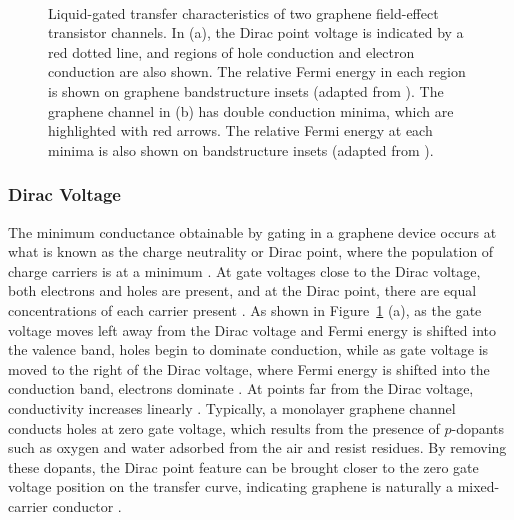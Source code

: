 \documentclass[
  a4paper,
]{scrbook}
\begin{document}
\begin{figure}
\begin{minipage}[t]{0.45\linewidth}
\end{minipage}%
%
\begin{minipage}[t]{0.01\linewidth}

{\centering 

~

}

\end{minipage}%

\caption{\label{fig-graphene-characteristics}Liquid-gated transfer
characteristics of two graphene field-effect transistor channels. In
(a), the Dirac point voltage is indicated by a red dotted line, and
regions of hole conduction and electron conduction are also shown. The
relative Fermi energy in each region is shown on graphene bandstructure
insets (adapted from \autocite{Geim2007,Ohno2015}). The graphene channel
in (b) has double conduction minima, which are highlighted with red
arrows. The relative Fermi energy at each minima is also shown on
bandstructure insets (adapted from \autocite{Peng2018}).}

\end{figure}

\hypertarget{dirac-voltage}{%
\subsubsection*{Dirac Voltage}\label{dirac-voltage}}

The minimum conductance obtainable by gating in a graphene device occurs
at what is known as the charge neutrality or Dirac point, where the
population of charge carriers is at a minimum
\autocite{Novoselov2004,Bartolomeo2011,Ohno2015,Kireev2017}. At gate
voltages close to the Dirac voltage, both electrons and holes are
present, and at the Dirac point, there are equal concentrations of each
carrier present \autocite{Novoselov2004,Bartolomeo2011,Peng2018}. As
shown in Figure~\ref{fig-graphene-characteristics} (a), as the gate
voltage moves left away from the Dirac voltage and Fermi energy is
shifted into the valence band, holes begin to dominate conduction, while
as gate voltage is moved to the right of the Dirac voltage, where Fermi
energy is shifted into the conduction band, electrons dominate
\autocite{Novoselov2004,Bartolomeo2011,Feng2014,Zhang2015}. At points
far from the Dirac voltage, conductivity increases linearly
\autocite{Novoselov2004,Bartolomeo2011,Peng2018}. Typically, a monolayer
graphene channel conducts holes at zero gate voltage, which results from
the presence of \(p\)-dopants such as oxygen and water adsorbed from the
air and resist residues. By removing these dopants, the Dirac point
feature can be brought closer to the zero gate voltage position on the
transfer curve, indicating graphene is naturally a mixed-carrier
conductor
\autocite{Novoselov2004,Bartolomeo2011,Zhang2015,Kireev2017,Peng2018}.
\end{document}
